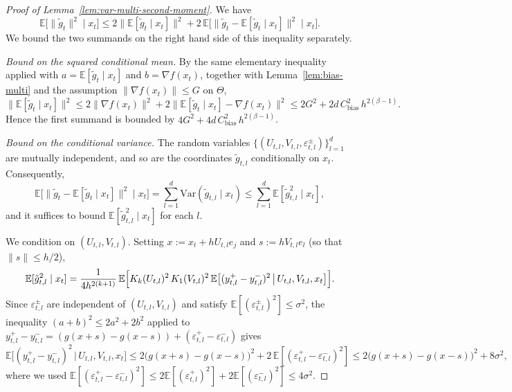 \documentclass{article}
\renewcommand{\leq}{\leqslant}
\theoremstyle{definition}
\begin{document}
\begin{proof}[Proof of Lemma~\ref{lem:var-multi-second-moment}]
\label{proof:lemma2}
We have
$$
\mathbb{E}\bigl[\|\tilde{g}_t\|^2\mid x_t\bigr]
\leq 2\bigl\|\mathbb{E}[\tilde{g}_t\mid x_t]\bigr\|^2
+2\,\mathbb{E}\bigl[\|\tilde{g}_t-\mathbb{E}[\tilde{g}_t\mid x_t]\|^2
\mid x_t\bigr].
$$
We bound 
the two summands on the right hand side of this inequality separately.

\medskip
\noindent\textit{Bound on the squared conditional mean.}
By the same elementary inequality applied with 
$a=\mathbb{E}[\tilde{g}_t\mid x_t]$ and $b=\nabla f(x_t)$, together 
with Lemma~\ref{lem:bias-multi} and the assumption 
$\|\nabla f(x_t)\|\leq G$ on $\Theta$,
$$
\bigl\|\mathbb{E}[\tilde{g}_t\mid x_t]\bigr\|^2
\leq 2\|\nabla f(x_t)\|^2
+2\bigl\|\mathbb{E}[\tilde{g}_t\mid x_t]-\nabla f(x_t)\bigr\|^2
\leq 2G^2+2d\,C_{\mathrm{bias}}^2\,h^{2(\beta-1)}.
$$
Hence the first summand is bounded by 
$4G^2+4d\,C_{\mathrm{bias}}^2\,h^{2(\beta-1)}$.

\medskip
\noindent\textit{Bound on the conditional variance.}
The random variables 
$\{(U_{t,l},V_{t,l},\varepsilon^\pm_{t,l})\}_{l=1}^d$ are mutually 
independent, and so are the coordinates 
$\tilde{g}_{t,l}$ conditionally on $x_t$. Consequently,
$$
\mathbb{E}\bigl[\|\tilde{g}_t-\mathbb{E}[\tilde{g}_t\mid x_t]\|^2
\mid x_t\bigr]
=\sum_{l=1}^d\mathrm{Var}(\tilde{g}_{t,l}\mid x_t)
\leq\sum_{l=1}^d\mathbb{E}[\tilde{g}_{t,l}^2\mid x_t],
$$
and it suffices to bound $\mathbb{E}[\tilde{g}_{t,l}^2\mid x_t]$ for 
each $l$.

We condition on $(U_{t,l},V_{t,l})$. Setting $x:=x_t+hU_{t,l}e_j$ 
and $s:=hV_{t,l}e_l$ (so that $\|s\|\leq h/2$),
\begin{equation}
\label{eq:var-tower}
\mathbb{E}[\tilde{g}_{t,l}^2\mid x_t]
=\frac{1}{4h^{2(k+1)}}\,\mathbb{E}\Bigl[
K_k(U_{t,l})^2\,K_1(V_{t,l})^2\,
\mathbb{E}\bigl[(y^+_{t,l}-y^-_{t,l})^2
\,\big|\,U_{t,l},V_{t,l},x_t\bigr]\Bigr].
\end{equation}
Since $\varepsilon^\pm_{t,l}$ are independent of $(U_{t,l},V_{t,l})$ and satisfy
$\mathbb{E}[(\varepsilon^\pm_{t,l})^2]\leq\sigma^2$, the inequality
$(a+b)^2\leq 2a^2+2b^2$ applied to
$y^+_{t,l}-y^-_{t,l}=(g(x+s)-g(x-s))+(\varepsilon^+_{t,l}-\varepsilon^-_{t,l})$
gives
\begin{equation}
\label{eq:var-noise-split}
\mathbb{E}\bigl[(y^+_{t,l}-y^-_{t,l})^2\,\big|\,U_{t,l},V_{t,l},x_t\bigr]
\leq 2\bigl(g(x+s)-g(x-s)\bigr)^2
+2\,\mathbb{E}[(\varepsilon^+_{t,l}-\varepsilon^-_{t,l})^2]
\leq 2\bigl(g(x+s)-g(x-s)\bigr)^2+8\sigma^2,
\end{equation}
where we used $\mathbb{E}[(\varepsilon^+_{t,l}-\varepsilon^-_{t,l})^2]
\leq 2\mathbb{E}[(\varepsilon^+_{t,l})^2]+2\mathbb{E}[(\varepsilon^-_{t,l})^2]\leq 4\sigma^2$.


\end{proof}
\end{document}
